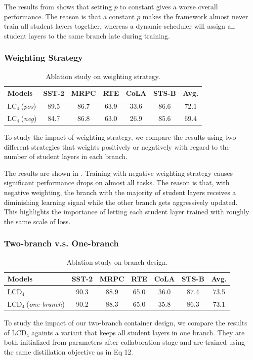 The results from  shows that setting $p$ to constant gives a worse overall performance. The reason is that a constant $p$ makes the
framework almost never train all student layers together, whereas a dynamic scheduler 
will assign all student layers to the same branch late during training.

\subsubsection{Weighting Strategy}

\begin{table}[h!]
    \centering
    \scriptsize
    \begin{tabular}{l|ccccc|c}
    \toprule
    Models            & SST-2 & MRPC & RTE  & CoLA & STS-B & Avg.  \\
    \midrule
    LC$_4~$(\textit{pos})       &89.5   &86.7  &63.9  &33.6  &86.6   &72.1  \\
    LC$_4~$(\textit{neg})       &84.7  &86.8  &63.0  &26.9  &85.6   &69.4  \\
    \bottomrule
    \end{tabular}
    \caption{Ablation study on weighting strategy.}
    \label{table:weighting}
\end{table}

To study the impact of weighting strategy, we compare the results using two different strategies that weights positively or negatively with regard to
the number of student layers in each branch. 


The results are shown in . Training with negative weighting strategy causes significant performance drops on almost all tasks. 
The reason is that, with negative weighting, the branch with the majority of student layers receives a diminishing learning signal while the other branch gets aggressively updated. This 
highlights the importance of letting each student layer trained with roughly the same scale of loss.

\subsubsection{Two-branch v.s. One-branch}
\begin{table}[h!]
    \centering
    \scriptsize
    \begin{tabular}{l|ccccc|c}
    \toprule
    Models            & SST-2 & MRPC & RTE  & CoLA & STS-B & Avg.  \\
    \midrule
    LCD$_4~$       &90.3   &88.9  &65.0  &36.0  &87.4   &73.5  \\
    LCD$_4~$(\textit{one-branch})       &90.2  &88.3  &65.0  &35.8  &86.3   &73.1  \\
    \bottomrule
    \end{tabular}
    \caption{Ablation study on branch design.}
    \label{table:archidemo}
\end{table}
To study the impact of our two-branch container design, we compare the results of LCD$_4$ againts a variant that keeps all student layers in one branch. They are both initialized from parameters after collaboration stage and are trained using the same 
distillation objective as in Eq 12.

